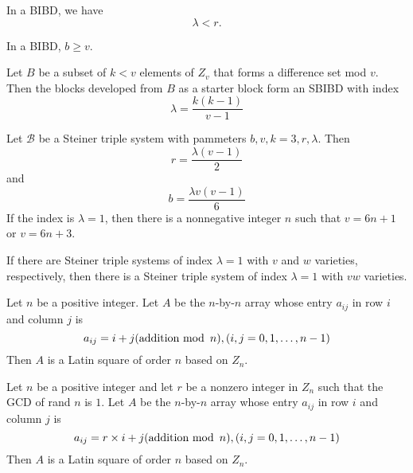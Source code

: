 \begin{corollary}
  \label{cor:10.2.3}
  In a BIBD, we have
  \[ \lambda < r. \]
\end{corollary}

\begin{theorem}
  \label{thm:10.2.4}
  In a BIBD, $b \geq v.$
\end{theorem}

\begin{theorem}
  \label{thm:10.2.5}
  Let $B$ be a subset of $k < v$ elements of $Z_v$ that forms a difference set mod $v$. Then the 
  blocks developed from $B$ as a starter block form an SBIBD with index
  \[ \lambda = \frac{k(k-1)}{v-1} \]
\end{theorem}

\begin{theorem}
  \label{thm:10.3.1}
  Let $\mathcal{B}$ be a Steiner triple system with pammeters $b, v, k = 3, r, \lambda$. Then
  \begin{equation}\label{10.4}
    r = \frac{\lambda(v-1)}{2}
  \end{equation}
  and 
  \begin{equation}\label{10.5}
    b = \frac{\lambda v(v-1)}{6}
  \end{equation}
  If the index is $\lambda = 1$, then there is a nonnegative integer $n$ such that $v = 6n +1$ or 
  $v = 6n +3$.
\end{theorem}

\begin{theorem}
  \label{thm:10.3.2}
  If there are Steiner triple systems of index $\lambda = 1$ with $v$ and $w$ varieties, 
  respectively, then there is a Steiner triple system of index $\lambda = 1$ with $vw$ varieties.
\end{theorem}

\begin{theorem}
  \label{thm:10.4.1}
  Let $n$ be a positive integer. Let $A$ be the $n$-by-$n$ array whose entry $a_{ij}$ in row $i$ 
  and column $j$ is
  \[ a_{i j}=i+j(\text{addition mod} \hspace{0.5em} n),(i, j=0,1, \ldots, n-1)\]
  Then $A$ is a Latin square of order $n$ based on $Z_n$.
\end{theorem}

\begin{theorem}
  \label{thm:10.4.2}
  Let $n$ be a positive integer and let $r$ be a nonzero integer in $Z_n$ such that the GCD of rand 
  $n$ is $1$. Let $A$ be the $n$-by-$n$ array whose entry $a_{ij}$ in row $i$ and column $j$ is
  \[ a_{i j}=r \times i+j(\text{addition mod} \hspace{0.5em} n),(i, j=0,1, \ldots, n-1) \]
  Then $A$ is a Latin square of order $n$ based on $Z_n$.
\end{theorem}

